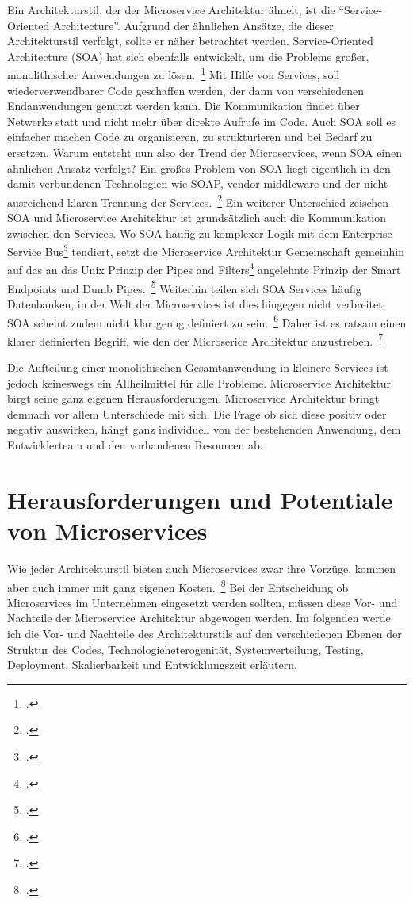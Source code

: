 Ein Architekturstil, der der Microservice Architektur ähnelt, ist die ``Service-Oriented Architecture''. Aufgrund der ähnlichen Ansätze, die dieser Architekturstil verfolgt, sollte er näher betrachtet werden.
Service-Oriented Architecture (SOA) hat sich ebenfalls entwickelt, um die Probleme großer, monolithischer Anwendungen zu lösen.~\footcite[][Seite 8]{newman2015building} Mit Hilfe von Services, soll wiederverwendbarer Code geschaffen werden, der dann von verschiedenen Endanwendungen genutzt werden kann. Die Kommunikation findet über Netwerke statt und nicht mehr über direkte Aufrufe im Code. Auch SOA soll es einfacher machen Code zu organisieren, zu strukturieren und bei Bedarf zu ersetzen. Warum entsteht nun also der Trend der Microservices, wenn SOA einen ähnlichen Ansatz verfolgt? Ein großes Problem von SOA liegt eigentlich in den damit verbundenen Technologien wie SOAP, vendor middleware und der nicht ausreichend klaren Trennung der Services.~\footcite[][Seite 8]{newman2015building} 
Ein weiterer Unterschied zeischen SOA und Microservice Architektur ist grundsätzlich auch die Kommunikation zwischen den Services. Wo SOA häufig zu komplexer Logik mit dem Enterprise Service Bus\footcite[][]{esb} tendiert, setzt die Microservice Architektur Gemeinschaft gemeinhin auf das an das Unix Prinzip der Pipes and Filters\footcite[vgl.][]{microsoft:pipes} angelehnte Prinzip der Smart Endpoints und Dumb Pipes.~\footcite[vgl.][]{Fowler:Intro}
Weiterhin teilen sich SOA Services häufig Datenbanken, in der Welt der Microservices ist dies hingegen nicht verbreitet. SOA scheint zudem nicht klar genug definiert zu sein.~\footcite[vgl.][]{Fowler:Intro} Daher ist es ratsam einen klarer definierten Begriff, wie den der Microserice Architektur anzustreben.~\footcite[][]{Fowler:Intro}

Die Aufteilung einer monolithischen Gesamtanwendung in kleinere Services ist jedoch keineswegs ein Allheilmittel für alle Probleme. Microservice Architektur birgt seine ganz eigenen Herausforderungen. Microservice Architektur bringt demnach vor allem Unterschiede mit sich. Die Frage ob sich diese positiv oder negativ auswirken, hängt ganz individuell von der bestehenden Anwendung, dem Entwicklerteam und den vorhandenen Resourcen ab.

\section{Herausforderungen und Potentiale von Microservices}
Wie jeder Architekturstil bieten auch Microservices zwar ihre Vorzüge, kommen aber auch immer mit ganz eigenen Kosten.~\footcite[vgl.][]{Fowler:Guide}
Bei der Entscheidung ob Microservices im Unternehmen eingesetzt werden sollten, müssen diese Vor- und Nachteile der Microservice Architektur abgewogen werden.
Im folgenden werde ich die Vor- und Nachteile des Architekturstils auf den verschiedenen Ebenen der Struktur des Codes, Technologieheterogenität, Systemverteilung, Testing, Deployment, Skalierbarkeit und Entwicklungszeit erläutern.

